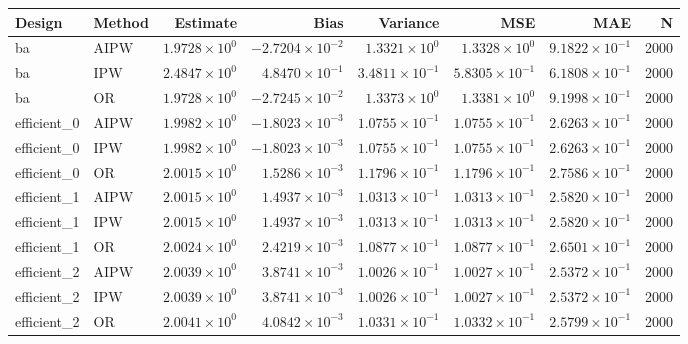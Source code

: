 \begin{table}[ht]
\centering
\begin{tabular}{llrrrrrr}
  \toprule
Design & Method & Estimate & Bias & Variance & MSE & MAE & N \\ 
  \midrule
ba & AIPW & $1.9728 \times 10^{0}$ & $-2.7204 \times 10^{-2}$ & $1.3321 \times 10^{0}$ & $1.3328 \times 10^{0}$ & $9.1822 \times 10^{-1}$ & 2000 \\ 
  ba & IPW & $2.4847 \times 10^{0}$ & $4.8470 \times 10^{-1}$ & $3.4811 \times 10^{-1}$ & $5.8305 \times 10^{-1}$ & $6.1808 \times 10^{-1}$ & 2000 \\ 
  ba & OR & $1.9728 \times 10^{0}$ & $-2.7245 \times 10^{-2}$ & $1.3373 \times 10^{0}$ & $1.3381 \times 10^{0}$ & $9.1998 \times 10^{-1}$ & 2000 \\ 
   \midrule
efficient\_0 & AIPW & $1.9982 \times 10^{0}$ & $-1.8023 \times 10^{-3}$ & $1.0755 \times 10^{-1}$ & $1.0755 \times 10^{-1}$ & $2.6263 \times 10^{-1}$ & 2000 \\ 
  efficient\_0 & IPW & $1.9982 \times 10^{0}$ & $-1.8023 \times 10^{-3}$ & $1.0755 \times 10^{-1}$ & $1.0755 \times 10^{-1}$ & $2.6263 \times 10^{-1}$ & 2000 \\ 
  efficient\_0 & OR & $2.0015 \times 10^{0}$ & $1.5286 \times 10^{-3}$ & $1.1796 \times 10^{-1}$ & $1.1796 \times 10^{-1}$ & $2.7586 \times 10^{-1}$ & 2000 \\ 
   \midrule
efficient\_1 & AIPW & $2.0015 \times 10^{0}$ & $1.4937 \times 10^{-3}$ & $1.0313 \times 10^{-1}$ & $1.0313 \times 10^{-1}$ & $2.5820 \times 10^{-1}$ & 2000 \\ 
  efficient\_1 & IPW & $2.0015 \times 10^{0}$ & $1.4937 \times 10^{-3}$ & $1.0313 \times 10^{-1}$ & $1.0313 \times 10^{-1}$ & $2.5820 \times 10^{-1}$ & 2000 \\ 
  efficient\_1 & OR & $2.0024 \times 10^{0}$ & $2.4219 \times 10^{-3}$ & $1.0877 \times 10^{-1}$ & $1.0877 \times 10^{-1}$ & $2.6501 \times 10^{-1}$ & 2000 \\ 
   \midrule
efficient\_2 & AIPW & $2.0039 \times 10^{0}$ & $3.8741 \times 10^{-3}$ & $1.0026 \times 10^{-1}$ & $1.0027 \times 10^{-1}$ & $2.5372 \times 10^{-1}$ & 2000 \\ 
  efficient\_2 & IPW & $2.0039 \times 10^{0}$ & $3.8741 \times 10^{-3}$ & $1.0026 \times 10^{-1}$ & $1.0027 \times 10^{-1}$ & $2.5372 \times 10^{-1}$ & 2000 \\ 
  efficient\_2 & OR & $2.0041 \times 10^{0}$ & $4.0842 \times 10^{-3}$ & $1.0331 \times 10^{-1}$ & $1.0332 \times 10^{-1}$ & $2.5799 \times 10^{-1}$ & 2000 \\ 

\end{tabular}
\end{table}

